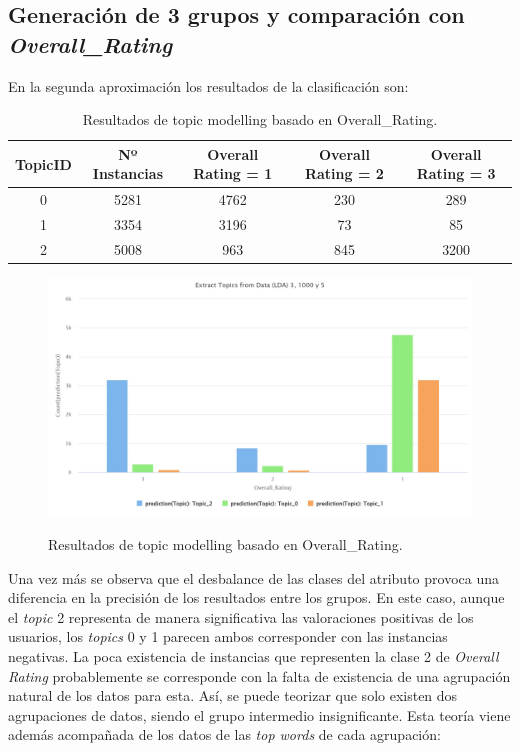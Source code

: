 \documentclass[es]{uc3mreport}
\begin{document}
\begin{report}
\subsection{Generación de 3 grupos y comparación con \textit{Overall\_Rating}}

En la segunda aproximación los resultados de la clasificación son:

\begin{table}[H]
\center
\begin{tabular}{@{}ccccc@{}}
    \toprule
    TopicID & Nº Instancias & Overall Rating = 1 & Overall Rating = 2 & Overall Rating = 3 \\
    \midrule
    0       & 5281          & 4762               & 230                & 289 \\
    1       & 3354          & 3196               & 73                 & 85  \\
    2       & 5008          & 963                & 845                & 3200\\
    \bottomrule
\end{tabular}
\caption{Resultados de topic modelling basado en Overall\_Rating.}
\end{table}

\begin{figure}[H]
    \center
    \includegraphics[width=0.85\linewidth]{graph_3topic_1000iter.jpeg}\\
    \caption{Resultados de topic modelling basado en Overall\_Rating.}
\end{figure}

Una vez más se observa que el desbalance de las clases del atributo provoca una
diferencia en la precisión de los resultados entre los grupos. En este caso,
aunque el \textit{topic} 2 representa de manera significativa las valoraciones positivas
de los usuarios, los \textit{topics} 0 y 1 parecen ambos corresponder con las instancias
negativas. La poca existencia de instancias que representen la clase 2 de
\textit{Overall Rating} probablemente se corresponde con la falta de existencia de una
agrupación natural de los datos para esta. Así, se puede teorizar que solo
existen dos agrupaciones de datos, siendo el grupo intermedio insignificante.
Esta teoría viene además acompañada de los datos de las \textit{top words} de cada
agrupación:


\end{report}
\end{document}
